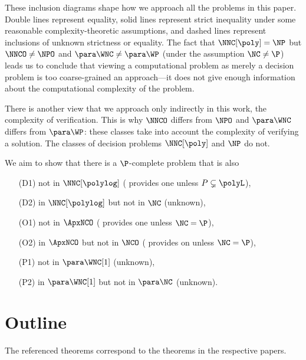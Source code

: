These inclusion diagrams shape how we approach all the problems in this paper.
Double lines represent equality, solid lines represent strict inequality under some reasonable complexity-theoretic assumptions, and dashed lines represent inclusions of unknown strictness or equality.
The fact that $\NNC[\poly] = \NP$ but $\NNCO \neq \NPO$ and $\para \WNC \neq \para \WP$ (under the assumption $\NC \neq \P$) leads us to conclude that viewing a computational problem as merely a decision problem is too coarse-grained an approach---it does not give enough information about the computational complexity of the problem.

There is another view that we approach only indirectly in this work, the complexity of verification.
This is why $\NNCO$ differs from $\NPO$ and $\para \WNC$ differs from $\para \WP$: these classes take into account the complexity of verifying a solution.
The classes of decision problems $\NNC[\poly]$ and $\NP$ do not.


We aim to show that there is a $\P$-complete problem that is also
\begin{enumerate}
\item[(D1)] not in $\NNC[\polylog]$ (\autocite[Theorem~3.9]{ncpcp} provides one unless $P \subsetneq \polyL$),
\item[(D2)] in $\NNC[\polylog]$ but not in $\NC$ (unknown),
\item[(O1)] not in $\ApxNCO$ (\autocite[Theorem~3.25]{ncapproximation} provides one unless $\NC = \P$),
\item[(O2)] in $\ApxNCO$ but not in $\NCO$ (\autocite[Theorem~3.25]{ncapproximation} provides on unless $\NC = \P$),
\item[(P1)] not in $\para \WNC[1]$ (unknown),
\item[(P2)] in $\para \WNC[1]$ but not in $\para \NC$ (unknown).
\end{enumerate}

\section{Outline}

The referenced theorems correspond to the theorems in the respective papers.

